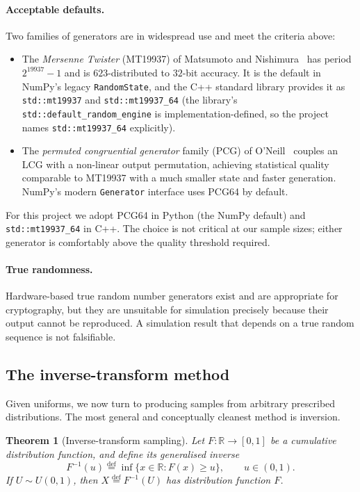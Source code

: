 \documentclass[11pt,a4paper]{article}
\theoremstyle{plain}
\newtheorem{theorem}{Theorem}[section]
\theoremstyle{definition}
\theoremstyle{remark}
\newcommand{\R}{\mathbb{R}}
\newcommand{\eqdef}{\overset{\mathrm{def}}{=}}
\begin{document}
\paragraph{Acceptable defaults.} Two families of generators are in
widespread use and meet the criteria above:
\begin{itemize}
\item The \emph{Mersenne Twister} (MT19937) of Matsumoto and
Nishimura~\cite{Matsumoto1998} has period $2^{19937}-1$ and is
$623$-distributed to $32$-bit accuracy. It is the default in NumPy's
legacy \texttt{RandomState}, and the C++ standard library provides it
as \texttt{std::mt19937} and \texttt{std::mt19937\_64} (the library's
\texttt{std::default\_random\_engine} is implementation-defined, so the
project names \texttt{std::mt19937\_64} explicitly).

\item The \emph{permuted congruential generator} family (PCG) of
O'Neill~\cite{ONeill2014} couples an LCG with a non-linear output
permutation, achieving statistical quality comparable to MT19937 with a
much smaller state and faster generation. NumPy's modern
\texttt{Generator} interface uses PCG64 by default.
\end{itemize}
For this project we adopt PCG64 in Python (the NumPy default) and
\texttt{std::mt19937\_64} in C++. The choice is not critical at our
sample sizes; either generator is comfortably above the quality
threshold required.

\paragraph{True randomness.} Hardware-based true random number
generators exist and are appropriate for cryptography, but they are
unsuitable for simulation precisely because their output cannot be
reproduced. A simulation result that depends on a true random sequence
is not falsifiable.

\subsection{The inverse-transform method}
\label{sec:inverse-transform}

Given uniforms, we now turn to producing samples from arbitrary
prescribed distributions. The most general and conceptually cleanest
method is inversion.

\begin{theorem}[Inverse-transform sampling]
\label{thm:inverse-transform}
Let $F: \R \to [0,1]$ be a cumulative distribution function, and define
its generalised inverse
\begin{equation}
F^{-1}(u) \eqdef \inf\{ x \in \R : F(x) \geq u \},
\qquad u \in (0,1).
\end{equation}
If $U \sim U(0,1)$, then $X \eqdef F^{-1}(U)$ has distribution function
$F$.
\end{theorem}
\end{document}
